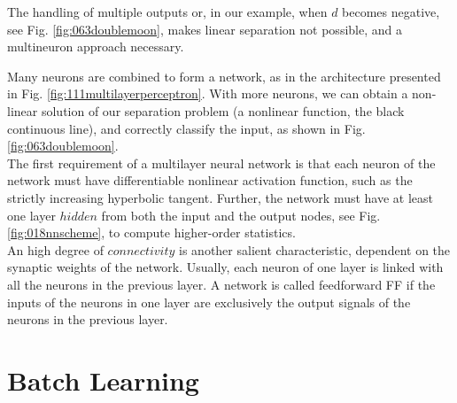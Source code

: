 

The handling of multiple outputs or, in our example, 
when $d$ becomes negative, see Fig. \ref{fig:063doublemoon}, makes linear
separation not possible, and a multineuron approach necessary. 

Many neurons are combined to form a network, as in the architecture presented
in Fig. \ref{fig:111multilayerperceptron}.
With more neurons, we can obtain a non-linear solution of our separation
problem (a nonlinear function, the black continuous line), and correctly
classify the input, as shown in Fig.
\ref{fig:063doublemoon}.\\
The first requirement of a multilayer neural network is that each neuron 
of the network must have differentiable nonlinear activation
function, such as the strictly increasing hyperbolic tangent.
Further, the network must have at least one layer $hidden$ from both the input
and the output nodes, see Fig. \ref{fig:018nnscheme}, to compute higher-order
statistics.\\
An high degree of $connectivity$ is another salient characteristic, dependent on
the synaptic weights of the network.
Usually, each neuron of one layer is linked with all the neurons in the previous
layer.
A network is called feedforward \acs{FF} if the inputs of the neurons in
one layer are exclusively the output signals of the neurons in the previous
layer.\\


\section{Batch Learning}
\label{sec:batchlearning}

